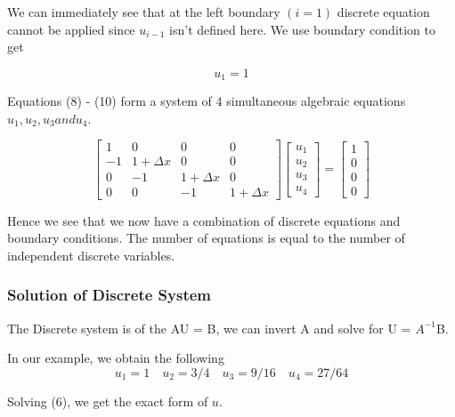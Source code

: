 \documentclass[12pt]{article}
\begin{document}
We can immediately see that at the left boundary $(i=1)$ discrete equation cannot be applied since $u_{i-1}$ isn't defined here. We use boundary condition to get

\begin{equation*}
    u_1 = 1
\end{equation*}

Equations (8) - (10) form a system of 4 simultaneous algebraic equations $u_1, u_2, u_3 and u_4$. 

\begin{equation}
\begin{bmatrix}
1 & 0 & 0 & 0\\
-1 & 1+\Delta x & 0 & 0\\
0 & -1 & 1+\Delta x & 0\\
0 & 0 & -1 & 1+\Delta x
\end{bmatrix}
\begin{bmatrix}
u_1\\
u_2\\
u_3\\
u_4
\end{bmatrix}
=
\begin{bmatrix}
1\\
0\\
0\\
0
\end{bmatrix}
\end{equation}

Hence we see that we now have a combination of discrete equations and boundary conditions. The number of equations is equal to the number of independent discrete variables.

\subsubsection{Solution of Discrete System}
 The Discrete system is of the AU = B, we can invert A and solve for U = $A^{-1}$B.

 In our example, we obtain the following
\begin{equation*}
    u_1 =1 \quad u_2 = 3/4 \quad u_3 = 9/16 \quad u_4 = 27/64
\end{equation*}

Solving (6), we get the exact form of $u$.
\end{document}
